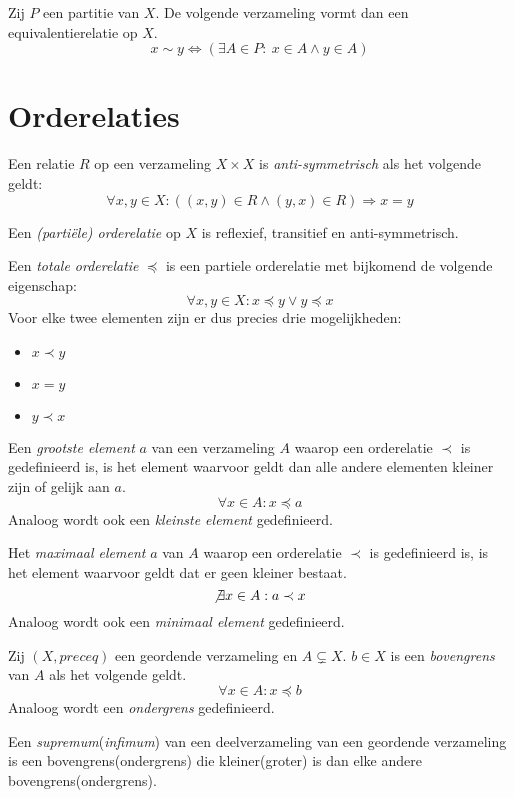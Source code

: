 \documentclass[main.tex]{subfiles}
\begin{document}
\begin{st}
  \label{st:partitie-equivalentierelatie}
  Zij $P$ een partitie van $X$.
  De volgende verzameling vormt dan een equivalentierelatie op $X$.
  \[ x \sim y \Leftrightarrow (\exists A \in P:\ x \in A \wedge y \in A )\]

\end{st}

\section{Orderelaties}
\label{sec:orderelaties}

\begin{de}
  Een relatie $R$ op een verzameling $X \times X$ is \emph{anti-symmetrisch} als het volgende geldt:
  \[ \forall x,y \in X: ((x,y) \in R \wedge (y,x) \in R) \Rightarrow x = y \]
\end{de}

\begin{de}
  Een \emph{(parti\"ele) orderelatie} op $X$ is reflexief, transitief en anti-symmetrisch.
\end{de}

\begin{de}
  Een \emph{totale orderelatie} $\preceq$ is een partiele orderelatie met bijkomend de volgende eigenschap:
  \[ \forall x,y \in X: x \preceq y \vee y \preceq x \]
  Voor elke twee elementen zijn er dus precies drie mogelijkheden:
  \begin{itemize}
  \item $x \prec y$
  \item $x = y$
  \item $y \prec x$
  \end{itemize}
\end{de}

\begin{de}
  Een \emph{grootste element} $a$ van een verzameling $A$ waarop een orderelatie $\prec$ is gedefinieerd is, is het element waarvoor geldt dan alle andere elementen kleiner zijn of gelijk aan $a$.
  \[ \forall x \in A: x \preceq a \] 
  Analoog wordt ook een \emph{kleinste element} gedefinieerd.
\end{de}

\begin{de}
  Het \emph{maximaal element} $a$ van $A$ waarop een orderelatie $\prec$ is gedefinieerd is, is het element waarvoor geldt dat er geen kleiner bestaat.
  \[ \not\exists x \in A: a \prec x \]
  Analoog wordt ook een \emph{minimaal element} gedefinieerd.
\end{de}

\begin{de}
  Zij $(X,preceq)$ een geordende verzameling en $A \subsetneq X$.
  $b \in X$ is een \emph{bovengrens} van $A$ als het volgende geldt.
  \[ \forall x \in A: x \preceq b \]
  Analoog wordt een \emph{ondergrens} gedefinieerd.
\end{de}

\begin{de}
  Een \emph{supremum}(\emph{infimum}) van een deelverzameling van een geordende verzameling is een bovengrens(ondergrens) die kleiner(groter) is dan elke andere bovengrens(ondergrens).
\end{de}
\end{document}
